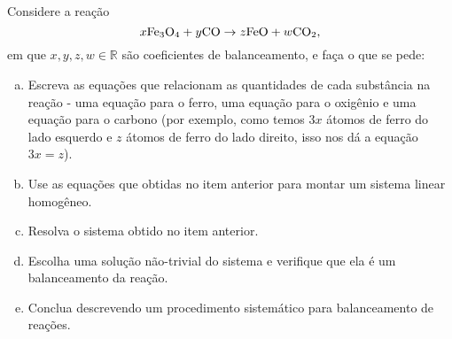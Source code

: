 \documentclass[a4paper,10pt]{article}
\def\R{\mathbb R}
\begin{document}
\begin{bonus}
	Considere a reação
	\[x{\rm Fe_3O_4}+y{\rm CO}\rightarrow z{\rm FeO}+w{\rm CO_2},\]em que $x,y,z,w\in \R$ são coeficientes de balanceamento, e faça o que se pede:
	\begin{enumerate}[a)]
		\item Escreva as equações que relacionam as quantidades de cada substância na reação - uma equação para o ferro, uma equação para o oxigênio e uma equação para o carbono (por exemplo, como temos $3x$ átomos de ferro do lado esquerdo e $z$ átomos de ferro do lado direito, isso nos dá a equação $3x=z$).
		\item Use as equações que obtidas no item anterior para montar um sistema linear homogêneo.
		\item Resolva o sistema obtido no item anterior.
		\item Escolha uma solução não-trivial do sistema e verifique que ela é um balanceamento da reação.
		\item Conclua descrevendo um procedimento sistemático para balanceamento de reações.
	\end{enumerate}
\end{bonus}
\end{document}
